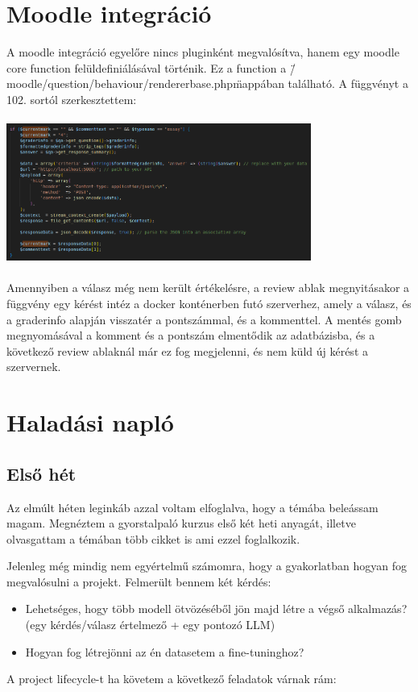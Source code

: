 \documentclass{article}
\begin{document}
\section{Moodle integráció}
A moodle integráció egyelőre nincs pluginként megvalósítva, hanem egy moodle core function felüldefiniálásával történik.
Ez a function a \"/moodle/question/behaviour/rendererbase.php\" mappában található. A függvényt a 102. sortól szerkesztettem:
\\
\\
\includegraphics[width=10cm]{moodle.png}
\\
\\
\indent Amennyiben a válasz még nem került értékelésre, a review ablak megnyitásakor a függvény egy kérést intéz a docker konténerben futó szerverhez, amely a válasz, és a graderinfo alapján visszatér a pontszámmal, és a kommenttel.
A mentés gomb megnyomásával a komment és a pontszám elmentődik az adatbázisba, és a következő review ablaknál már ez fog megjelenni, és nem küld új kérést a szervernek.

\section{Haladási napló}

\subsection{Első hét}
Az elmúlt héten leginkáb azzal voltam elfoglalva, hogy a témába beleássam magam. 
Megnéztem a gyorstalpaló kurzus első két heti anyagát, illetve olvasgattam a témában
több cikket is ami ezzel foglalkozik.

Jelenleg még mindig nem egyértelmű számomra, hogy a gyakorlatban hogyan fog megvalósulni a projekt.
Felmerült bennem két kérdés:
\begin{itemize}
  \item Lehetséges, hogy több modell ötvözéséből jön majd létre a végső alkalmazás? (egy kérdés/válasz értelmező + egy pontozó LLM)
  \item Hogyan fog létrejönni az én datasetem a fine-tuninghoz?
\end{itemize}
A project lifecycle-t ha követem a következő feladatok várnak rám:
 
\end{document}
